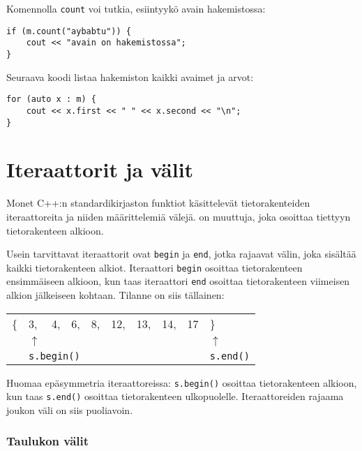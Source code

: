 Komennolla \texttt{count} voi
tutkia, esiintyykö avain hakemistossa:

\begin{lstlisting}
if (m.count("aybabtu")) {
    cout << "avain on hakemistossa";
}
\end{lstlisting}

Seuraava koodi listaa hakemiston
kaikki avaimet ja arvot:

\begin{lstlisting}
for (auto x : m) {
    cout << x.first << " " << x.second << "\n";
}
\end{lstlisting}

\section{Iteraattorit ja välit}


Monet C++:n standardikirjaston funktiot
käsittelevät tietorakenteiden iteraattoreita
ja niiden määrittelemiä välejä.
 on muuttuja,
joka osoittaa tiettyyn tietorakenteen alkioon.

Usein tarvittavat iteraattorit ovat \texttt{begin}
ja \texttt{end}, jotka rajaavat välin,
joka sisältää kaikki tietorakenteen alkiot.
Iteraattori \texttt{begin} osoittaa
tietorakenteen ensimmäiseen alkioon,
kun taas iteraattori \texttt{end} osoittaa
tietorakenteen viimeisen alkion jälkeiseen kohtaan.
Tilanne on siis tällainen:

\begin{center}
\begin{tabular}{llllllllll}
\{ & 3, & 4, & 6, & 8, & 12, & 13, & 14, & 17 & \} \\
& $\uparrow$ & & & & & & & & $\uparrow$ \\
& \multicolumn{3}{l}{\texttt{s.begin()}} & & & & & & \texttt{s.end()} \\
\end{tabular}
\end{center}

Huomaa epäsymmetria iteraattoreissa:
\texttt{s.begin()} osoittaa tietorakenteen alkioon,
kun taas \texttt{s.end()} osoittaa tietorakenteen ulkopuolelle.
Iteraattoreiden rajaama joukon väli on siis puoliavoin.

\subsubsection{Taulukon välit}

